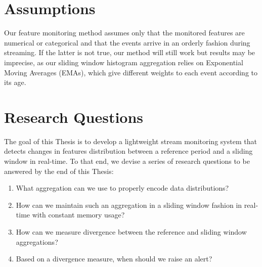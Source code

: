 \section{Assumptions}
Our feature monitoring method assumes only that the monitored features are numerical or categorical and that the events arrive in an orderly fashion during streaming. If the latter is not true, our method will still work but results may be imprecise, as our sliding window histogram aggregation relies on Exponential Moving Averages (EMAs), which give different weights to each event according to its age.

\section{Research Questions} \label{sec:rqs}
The goal of this Thesis is to develop a lightweight stream monitoring system that detects changes in features distribution between a reference period and a sliding window in real-time. To that end, we devise a series of research questions to be answered by the end of this Thesis:

\begin{enumerate}[leftmargin=1.75cm, label=\textbf{(RQ\arabic*)}]
    \item What aggregation can we use to properly encode data distributions?
    \item How can we maintain such an aggregation in a sliding window fashion in real-time with constant memory usage?
    \item How can we measure divergence between the reference and sliding window aggregations?
    \item Based on a divergence measure, when should we raise an alert?
\end{enumerate}
